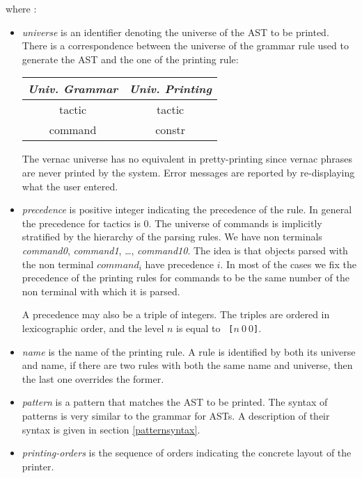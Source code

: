 where :
\begin{itemize}
\item {\it universe} is an identifier denoting the universe of the AST to
  be printed. There is a correspondence between the universe of the
  grammar rule used to generate the AST and the one of the printing
  rule:

\begin{center}
\begin{tabular}{|c|c|}\hline
{\em Univ. Grammar}  & {\em Univ. Printing} \\ \hline 
tactic   & tactic \\ \hline
command  & constr \\ \hline 
\end{tabular}
\end{center}

  The vernac universe has no equivalent in pretty-printing since
  vernac phrases are never printed by the system. Error messages are
  reported by re-displaying what the user entered.

\item {\it precedence} is positive integer indicating the precedence
  of the rule. In general the precedence for tactics is 0. The
  universe of commands is implicitly stratified by the hierarchy of
  the parsing rules. We have non terminals \textit{command0},
  \textit{command1}, \ldots, \textit{command10}. 
  The idea is that objects parsed with the non terminal
  $command_i$ have precedence $i$. In most of the cases we fix the
  precedence of the printing rules for commands to be the same number
  of the non terminal with which it is parsed.

  A precedence may also be a triple of integers. The triples are
  ordered in lexicographic order, and the level $n$ is equal to {\tt
  [$n~0~0$]}.

\item {\it name} is the name of the
  printing rule. A rule is identified by both its universe and name,
  if there are two rules with both the same name and universe, then
  the last one overrides the former.

\item {\it pattern} is a pattern that matches the AST to be
  printed. The syntax of patterns is very similar to the grammar for ASTs.
  A description of their syntax is given in section
  \ref{patternsyntax}.

\item {\it printing-orders} is the sequence of orders indicating the
  concrete layout of the printer.
\end{itemize}

